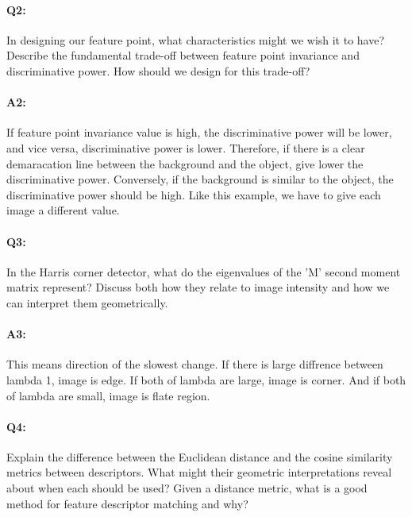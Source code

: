 
\pagebreak
\paragraph{Q2:} In designing our feature point, what characteristics might we wish it to have? Describe the fundamental trade-off between feature point invariance and discriminative power. How should we design for this trade-off?

\paragraph{A2:} If feature point invariance value is high, the discriminative power will be lower, and vice versa, discriminative power is lower. Therefore, if there is a clear demaracation line between the background and the object, give lower the discriminative power. Conversely, if the background is similar to the object, the discriminative power should be high. Like this example, we have to give each image a different value.




\pagebreak
\paragraph{Q3:} In the Harris corner detector, what do the eigenvalues of the 'M' second moment matrix represent? Discuss both how they relate to image intensity and how we can interpret them geometrically.

\paragraph{A3:} This means direction of the slowest change. If there is large diffrence between lambda 1, image is edge. If both of lambda are large, image is corner. And if both of lambda are small, image is flate region.




\pagebreak
\paragraph{Q4:} Explain the difference between the Euclidean distance and the cosine similarity metrics between descriptors. What might their geometric interpretations reveal about when each should be used? Given a distance metric, what is a good method for feature descriptor matching and why?

